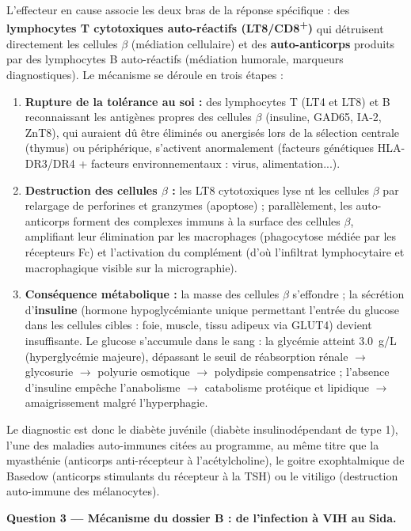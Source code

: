 \documentclass[11pt]{article}
\newcommand{\cle}[1]{{\popxbold\color{popdark}#1}}
\begin{document}
\begin{exoresolu}
L'effecteur en cause associe les deux bras de la réponse spécifique : des \textbf{lymphocytes T cytotoxiques auto-réactifs (LT8/CD8\textsuperscript{+})} qui détruisent directement les cellules $\beta$ (médiation cellulaire) et des \textbf{auto-anticorps} produits par des lymphocytes B auto-réactifs (médiation humorale, marqueurs diagnostiques). Le mécanisme se déroule en trois étapes :
\begin{enumerate}
\item \textbf{Rupture de la tolérance au soi :} des lymphocytes T (LT4 et LT8) et B reconnaissant les antigènes propres des cellules $\beta$ (insuline, GAD65, IA-2, ZnT8), qui auraient dû être éliminés ou anergisés lors de la sélection centrale (thymus) ou périphérique, s'activent anormalement (facteurs génétiques HLA-DR3/DR4 + facteurs environnementaux : virus, alimentation...).
\item \textbf{Destruction des cellules $\beta$ :} les LT8 cytotoxiques lyse nt les cellules $\beta$ par relargage de perforines et granzymes (apoptose) ; parallèlement, les auto-anticorps forment des \cle{complexes immuns} à la surface des cellules $\beta$, amplifiant leur élimination par les macrophages (phagocytose médiée par les récepteurs Fc) et l'activation du complément (d'où l'infiltrat lymphocytaire et macrophagique visible sur la micrographie).
\item \textbf{Conséquence métabolique :} la masse des cellules $\beta$ s'effondre ; la sécrétion d'\textbf{insuline} (hormone hypoglycémiante unique permettant l'entrée du glucose dans les cellules cibles : foie, muscle, tissu adipeux via GLUT4) devient insuffisante. Le glucose s'accumule dans le sang : la glycémie atteint \SI{3,0}{g/L} (hyperglycémie majeure), dépassant le seuil de réabsorption rénale $\rightarrow$ glycosurie $\rightarrow$ polyurie osmotique $\rightarrow$ polydipsie compensatrice ; l'absence d'insuline empêche l'anabolisme $\rightarrow$ catabolisme protéique et lipidique $\rightarrow$ amaigrissement malgré l'hyperphagie.
\end{enumerate}
Le diagnostic est donc le \cle{diabète juvénile} (diabète insulinodépendant de type 1), l'une des maladies auto-immunes citées au programme, au même titre que la myasthénie (anticorps anti-récepteur à l'acétylcholine), le goitre exophtalmique de Basedow (anticorps stimulants du récepteur à la TSH) ou le vitiligo (destruction auto-immune des mélanocytes).

\textbf{Question 3 — Mécanisme du dossier B : de l'infection à VIH au Sida.}


\end{exoresolu}
\end{document}
